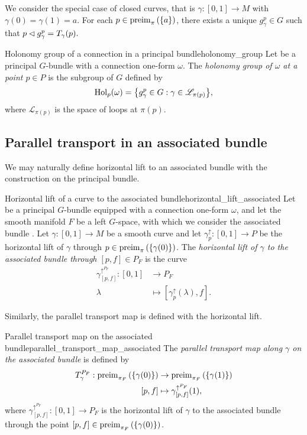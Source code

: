 We consider the special case of closed curves, that is \(\gamma : [0,1] \to M\) with \(\gamma(0) = \gamma(1) = a.\) For each \(p \in \operatorname{preim}_{\pi}{\left(\{a\}\right)}\), there exists a unique \(g^p_{\gamma} \in G\) such that \(p \mathbin{\vartriangleleft} g^p_{\gamma} = T_{\gamma}(p).\)

\begin{definition}{Holonomy group of a connection in a principal bundle}{holonomy_group}
    Let  be a principal \(G\)-bundle with a connection one-form \(\omega\). The \emph{holonomy group of \(\omega\) at a point \(p \in P\)} is the subgroup of \(G\) defined by
    \begin{equation*}
        \mathrm{Hol}_p(\omega) = \set*{g^p_{\gamma} \in G : \gamma \in \mathscr{L}_{\pi(p)}},
    \end{equation*}
    where \(\mathscr{L}_{\pi(p)}\) is the space of loops at \(\pi(p).\)
\end{definition}

\subsection{Parallel transport in an associated bundle}
We may naturally define horizontal lift to an associated bundle with the construction on the principal bundle.
\begin{definition}{Horizontal lift of a curve to the associated bundle}{horizontal_lift_associated}
    Let  be a principal \(G\)-bundle equipped with a connection one-form \(\omega\), and let the smooth manifold \(F\) be a left \(G\)-space, with which we consider the associated bundle . Let \(\gamma : [0,1] \to M\) be a smooth curve and let \(\gamma^\uparrow_p : [0,1] \to P\) be the horizontal lift of \(\gamma\) through \(p \in \operatorname{preim}_{\pi}{\left(\{\gamma(0)\}\right)}\). The \emph{horizontal lift of \(\gamma\) to the associated bundle through \([p,f] \in P_F\)} is the curve
    \begin{align*}
        \gamma^{\uparrow^{P_F}}_{[p,f]} : [0,1] &\to P_F\\
                                        \lambda &\mapsto [\gamma_p^\uparrow(\lambda), f].
    \end{align*}
\end{definition}

Similarly, the parallel transport map is defined with the horizontal lift.
\begin{definition}{Parallel transport map on the associated bundle}{parallel_transport_map_associated}
    The \emph{parallel transport map along \(\gamma\) on the associated bundle } is defined by
    \begin{align*}
        T^{P_F}_{\gamma} : \operatorname{preim}_{\pi_F}{\left(\{\gamma(0)\}\right)} &\to \operatorname{preim}_{\pi_F}{\left(\{\gamma(1)\}\right)}\\
                                                    [p,f] &\mapsto \gamma_{[p,f]}^{\uparrow^{P_F}}(1),
    \end{align*}
    where \(\gamma_{[p,f]}^{\uparrow^{P_F}} : [0,1] \to P_F\) is the horizontal lift of \(\gamma\) to the associated bundle through the point \([p,f] \in \operatorname{preim}_{\pi_F}{\left(\{\gamma(0)\}\right)}\).
\end{definition}

